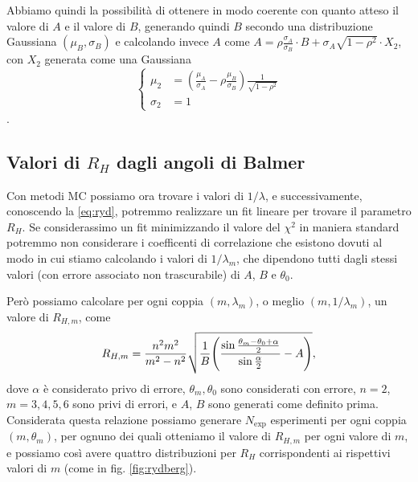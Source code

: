 \documentclass[a4paper,aps,12pt,tightenlines]{revtex4-2}
\begin{document}
Abbiamo quindi la possibilità di ottenere in modo coerente con quanto atteso il valore di $A$ e il valore di $B$, generando quindi $B$ secondo una distribuzione Gaussiana $(\mu_B, \sigma_B)$ e calcolando invece $A$ come $A=\rho \frac{\sigma_A}{\sigma_B}\cdot B + \sigma_A \sqrt{1-\rho^2} \cdot X_2$, con $X_2$ generata come una Gaussiana \begin{equation}\left\{\begin{aligned}\mu_2 &= \left(\frac{\mu_A}{\sigma_A} - \rho\frac{\mu_B}{\sigma_B}\right)\frac{1}{\sqrt{1-\rho^2}}\\\sigma_2 &= 1\end{aligned}\right.\end{equation}.

\subsection{Valori di $R_H$ dagli angoli di Balmer}\label{sec:R_H}

Con metodi MC possiamo ora trovare i valori di $1/\lambda$, e successivamente, conoscendo la \eqref{eq:ryd}, potremmo realizzare un fit lineare per trovare il parametro $R_H$. Se considerassimo un fit minimizzando il valore del $\chi^2$ in maniera standard potremmo non considerare i coefficenti di correlazione che esistono dovuti al modo in cui stiamo calcolando i valori di $1/\lambda_m$, che dipendono tutti dagli stessi valori (con errore associato non trascurabile) di $A$, $B$ e $\theta_0$. 

Però possiamo calcolare per ogni coppia $(m, \lambda_m)$, o meglio $(m, 1/\lambda_m)$, un valore di $R_{H,m}$, come \begin{equation} 
    R_{H,m} = \frac{n^2m^2}{m^2-n^2}\sqrt{\frac{1}{B} \qty(\frac{\sin\frac{\theta_m-\theta_0 + \alpha}{2}}{\sin\frac{\alpha}{2}}-A)},
\end{equation} dove $\alpha$ è considerato privo di errore, $\theta_m, \theta_0$ sono considerati con errore, $n=2$, $m=3,4,5,6$ sono privi di errori, e $A$, $B$ sono generati come definito prima. Considerata questa relazione possiamo generare $N_\text{exp}$ esperimenti per ogni coppia $(m, \theta_m)$, per ognuno dei quali otteniamo il valore di $R_{H,m}$ per ogni valore di $m$, e possiamo così avere quattro distribuzioni per $R_H$ corrispondenti ai rispettivi valori di $m$ (come in fig. \ref{fig:rydberg}). 
\end{document}

